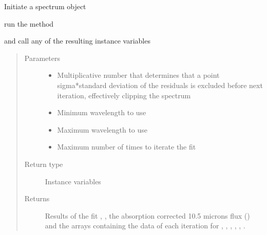\documentclass[letterpaper,10pt,english]{sphinxmanual}
\begin{document}
\begin{fulllineitems}
\begin{fulllineitems}
\sphinxAtStartPar
{}

\sphinxAtStartPar
Initiate a spectrum object

\sphinxAtStartPar
{}

\sphinxAtStartPar
run the method

\sphinxAtStartPar
{}

\sphinxAtStartPar
and call any of the resulting instance variables

\sphinxAtStartPar
{}
\begin{quote}\begin{description}
\item[{Parameters}] \leavevmode\begin{itemize}
\item {} 
\sphinxAtStartPar
{} \textendash{} Multiplicative number that determines that a point sigma*standard deviation of the residuals
is excluded before next iteration, effectively clipping the spectrum

\item {} 
\sphinxAtStartPar
{} \textendash{} Minimum wavelength to use

\item {} 
\sphinxAtStartPar
{} \textendash{} Maximum wavelength to use

\item {} 
\sphinxAtStartPar
{} \textendash{} Maximum number of times to iterate the fit

\end{itemize}

\item[{Return type}] \leavevmode
\sphinxAtStartPar
Instance variables

\item[{Returns}] \leavevmode
\sphinxAtStartPar
Results of the fit , , the absorption corrected 10.5 microns
flux () and the arrays containing the data of each iteration for
, , , , , .

\end{description}\end{quote}

\end{fulllineitems}


\end{fulllineitems}



\renewcommand{\indexname}{Python Module Index}
\begin{sphinxtheindex}
\let\bigletter\sphinxstyleindexlettergroup
\bigletter{m}
\item\relax{}
\end{sphinxtheindex}

\renewcommand{\indexname}{Index}
\printindex
\end{document}
